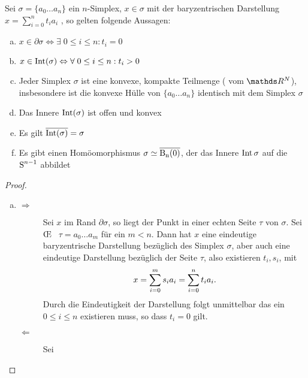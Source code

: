 \begin{Satz}
  \normalfont Sei $\sigma = \{ a_0 \ldots a_n \}$ ein $n$-Simplex,
  $x \in \sigma$ mit der baryzentrischen Darstellung
  $x=\sum\limits_{i=0}^n t_i a_i$ , so gelten folgende Aussagen:
  \begin{enumerate}[(a)]
  \item
    $x \in \partial\sigma \Leftrightarrow \exists \; 0 \leq i \leq n :
    t_i = 0$
  \item
    $x \in \Int(\sigma) \Leftrightarrow \forall \; 0 \leq i \leq n :
    t_i > 0$
  \item Jeder Simplex $\sigma$ ist eine konvexe, kompakte Teilmenge (
    vom $\R^N$), insbesondere ist die konvexe Hülle von
    $\{ a_0 \ldots a_n \}$ identisch mit dem Simplex $\sigma$
  \item Das Innere $\Int(\sigma)$ ist offen und konvex
  \item Es gilt $\overline{\Int(\sigma)} = \sigma$
  \item Es gibt einen Homöomorphismus $\sigma \simeq \Bn$, der das
    Innere $\Int{\sigma}$ auf die $\Sp^{n-1}$ abbildet
  \end{enumerate}
  \begin{proof}
	\begin{enumerate}[a)]
		\item 
		\begin{description}
		\item[\glqq $\Rightarrow$\grqq] Sei $x$ im Rand $\partial\sigma$, so liegt der Punkt in einer echten Seite $\tau$ von $\sigma$. Sei \OE~ $\tau = a_0 \ldots a_m$ für ein $m < n$. Dann hat $x$ eine eindeutige baryzentrische Darstellung bezüglich des Simplex $\sigma$, aber auch eine eindeutige Darstellung bezüglich der Seite $\tau$, also existieren $t_i,s_i$, mit
		\begin{gather*}
			x = \sp{0}{m} s_i a_i = \sp{0}{n} t_i a_i .
		\end{gather*}
		Durch die Eindeutigkeit der Darstellung folgt unmittelbar das ein 
		$0 \leq i \leq n$ existieren muss, so dass $t_i = 0$ gilt.
		\item[\glqq $\Leftarrow$ \grqq] Sei 
		\end{description}
 	\end{enumerate}
  \end{proof}
\end{Satz}


